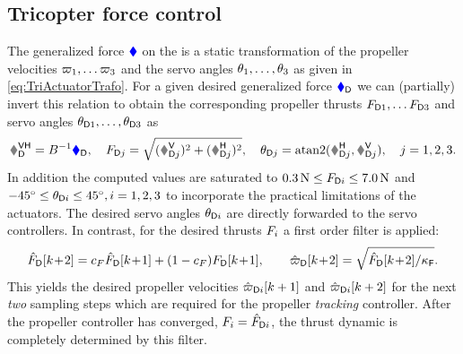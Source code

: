\subsection{Tricopter force control}
The generalized force $\genForce$ on the \Tricopter is a static transformation of the propeller velocities $\PropVel[1], \ldots \PropVel[3]$ and the servo angles $\aServo[1],\ldots,\aServo[3]$ as given in \eqref{eq:TriActuatorTrafo}.
For a given desired generalized force $\genForceD$ we can (partially) invert this relation to obtain the corresponding propeller thrusts $\PropForceD[1], \ldots \PropForceD[3]$ and servo angles $\aServoD[1],\ldots,\aServoD[3]$ as
\begin{align}\label{eq:TriInvActuatorTrafo}
 \F_{\idxDes}^\mathsf{VH} = B^{-1} \genForceD,
\quad
 \PropForceD[j] = \sqrt{(\F_{\idxDes j}^\mathsf{V})^2 + (\F_{\idxDes j}^\mathsf{H})^2},
\quad
 \aServoD[j] = \atanTwo(\F_{\idxDes j}^\mathsf{H}, \F_{\idxDes j}^\mathsf{V}),
\quad j = 1,2,3.
\end{align}
In addition the computed values are saturated to $0.3\,\unit{N} \leq \PropForceD[i] \leq 7.0\,\unit{N}$ and $-45^\circ\leq \aServoD[i] \leq 45^\circ, i=1,2,3$ to incorporate the practical limitations of the actuators.
The desired servo angles $\aServoD[i]$ are directly forwarded to the servo controllers.
In contrast, for the desired thrusts $\PropForce[i]$ a first order filter is applied:
\begin{align}\label{eq:PropPrefilter}
 \PropForceDF[][k\!+\!2] = c_F \PropForceDF[][k\!+\!1] + (1-c_F) \PropForceD[][k\!+\!1],
\qquad
 \PropVelDF[][k\!+\!2] = \sqrt{\sfrac{\PropForceDF[][k\!+\!2]}{\kappaF}}.
\end{align}
This yields the desired propeller velocities $\PropVelDF[i][k+1]$ and $\PropVelDF[i][k+2]$ for the next \textit{two} sampling steps which are required for the propeller \textit{tracking} controller.
After the propeller controller has converged, \ie $\PropForce[i] = \PropForceDF[i]$, the thrust dynamic is completely determined by this filter.

